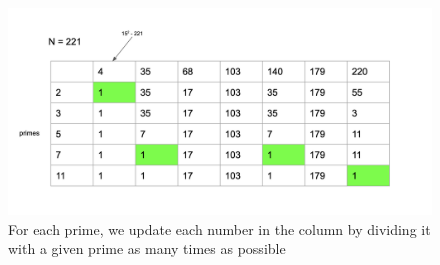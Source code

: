 \documentclass[11pt,twocolumn]{article}
\begin{document}
\begin{figure}[!htb]
    \centering
   \includegraphics[scale = 0.2]{QS1.png}
    \caption{For each prime, we update each number in the column by dividing it with a given prime as many times as possible}
    \label{QS-Samp}
\end{figure}
\end{document}

